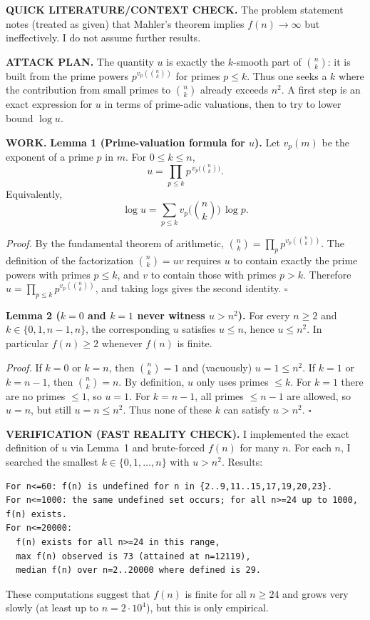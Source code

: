 \textbf{QUICK LITERATURE/CONTEXT CHECK.}
The problem statement notes (treated as given) that Mahler's theorem implies $f(n)\to\infty$ but ineffectively. I do not assume further results.

\textbf{ATTACK PLAN.}
The quantity $u$ is exactly the $k$-smooth part of $\binom{n}{k}$: it is built from the prime powers $p^{v_p(\binom{n}{k})}$ for primes $p\le k$. Thus one seeks a $k$ where the contribution from small primes to $\binom{n}{k}$ already exceeds $n^2$.
A first step is an exact expression for $u$ in terms of prime-adic valuations, then to try to lower bound $\log u$.

\textbf{WORK.}
\textbf{Lemma 1 (Prime-valuation formula for $u$).}
Let $v_p(m)$ be the exponent of a prime $p$ in $m$. For $0\le k\le n$,
\[
 u = \prod_{p\le k} p^{\,v_p\bigl(\binom{n}{k}\bigr)}.
\]
Equivalently,
\[\log u = \sum_{p\le k} v_p\bigl(\binom{n}{k}\bigr)\,\log p.
\]

\emph{Proof.}
By the fundamental theorem of arithmetic,
$\binom{n}{k}=\prod_p p^{v_p(\binom{n}{k})}$.
The definition of the factorization $\binom{n}{k}=uv$ requires $u$ to contain exactly the prime powers with primes $p\le k$, and $v$ to contain those with primes $p>k$.
Therefore $u=\prod_{p\le k} p^{v_p(\binom{n}{k})}$, and taking logs gives the second identity.
\hfill$\square$

\textbf{Lemma 2 ($k=0$ and $k=1$ never witness $u>n^2$).}
For every $n\ge2$ and $k\in\{0,1,n-1,n\}$, the corresponding $u$ satisfies $u\le n$, hence $u\le n^{2}$.
In particular $f(n)\ge 2$ whenever $f(n)$ is finite.

\emph{Proof.}
If $k=0$ or $k=n$, then $\binom{n}{k}=1$ and (vacuously) $u=1\le n^{2}$.
If $k=1$ or $k=n-1$, then $\binom{n}{k}=n$.
By definition, $u$ only uses primes $\le k$. For $k=1$ there are no primes $\le1$, so $u=1$.
For $k=n-1$, all primes $\le n-1$ are allowed, so $u=n$, but still $u=n\le n^{2}$.
Thus none of these $k$ can satisfy $u>n^{2}$.
\hfill$\square$

\textbf{VERIFICATION (FAST REALITY CHECK).}
I implemented the exact definition of $u$ via Lemma~1 and brute-forced $f(n)$ for many $n$.
For each $n$, I searched the smallest $k\in\{0,1,\dots,n\}$ with $u>n^{2}$.
Results:
\begin{verbatim}
For n<=60: f(n) is undefined for n in {2..9,11..15,17,19,20,23}.
For n<=1000: the same undefined set occurs; for all n>=24 up to 1000, f(n) exists.
For n<=20000:
  f(n) exists for all n>=24 in this range,
  max f(n) observed is 73 (attained at n=12119),
  median f(n) over n=2..20000 where defined is 29.
\end{verbatim}
These computations suggest that $f(n)$ is finite for all $n\ge 24$ and grows very slowly (at least up to $n=2\cdot 10^{4}$), but this is only empirical.

